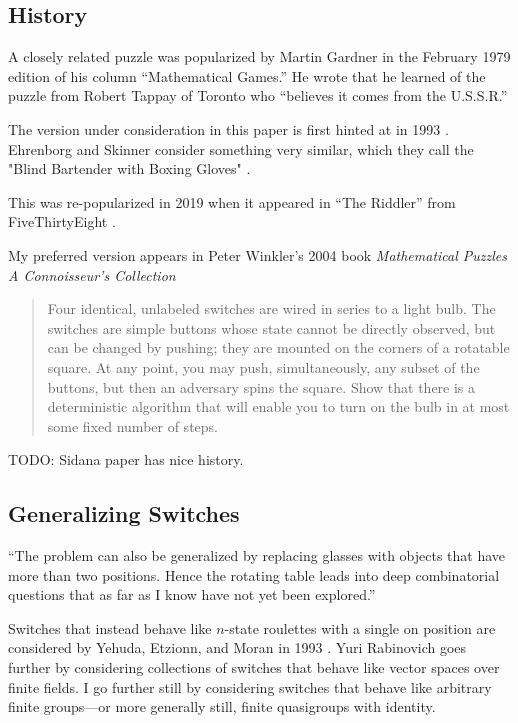 \subsection{History}
A closely related puzzle was popularized by Martin Gardner in the
February 1979 edition of his column ``Mathematical Games.'' \cite{Gardner1979Problem}
He wrote that he learned of the puzzle from Robert Tappay of Toronto who
``believes it comes from the U.S.S.R.''

The version under consideration in this paper is first hinted at in 1993
\cite{Yehuda1993}.
Ehrenborg and Skinner consider something very similar, which they call the
"Blind Bartender with Boxing Gloves" \cite{Ehrenborg1995}.

This was re-popularized in 2019 when it appeared in ``The Riddler'' from
FiveThirtyEight \cite{FiveThirtyEight}.

My preferred version appears in Peter Winkler's 2004 book
\textit{Mathematical Puzzles A Connoisseur's Collection}
\begin{quote}
  Four identical, unlabeled switches are wired in series to a light bulb.
  The switches are simple buttons whose state cannot be directly observed,
  but can be changed by pushing; they are mounted on the corners of a
  rotatable square. At any point, you may push, simultaneously, any subset
  of the buttons, but then an adversary spins the square. Show that there
  is a deterministic algorithm that will enable you to turn on the bulb in
  at most some fixed number of steps. \cite{Winkler2004}
\end{quote}

TODO: Sidana paper has nice history.

\subsection{Generalizing Switches}
``The problem can also be generalized by replacing glasses with objects that
have more than two positions. Hence the rotating table leads into deep
combinatorial questions that as far as I know have not yet been explored.''
\cite{Gardner1979Solution}

Switches that instead behave like $n$-state roulettes with a single on position
are considered by Yehuda, Etzionn, and Moran in 1993 \cite{Yehuda1993}.
Yuri Rabinovich \cite{Rabinovich2022} goes further by considering collections of switches that behave
like vector spaces over finite fields. I go further still by considering
switches that behave like arbitrary finite groups---or more generally still, finite quasigroups with identity.

